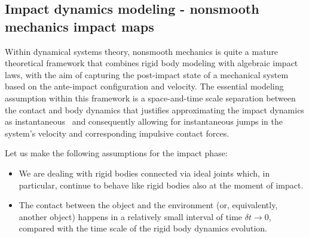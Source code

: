 \documentclass[letterpaper, 10 pt, conference]{ieeeconf}  %
\begin{document}
\subsection{Impact dynamics modeling - nonsmooth mechanics impact maps}
Within dynamical systems theory, nonsmooth mechanics is quite a mature theoretical framework that combines
rigid body modeling with algebraic impact laws, with the aim
of capturing the post-impact state of a mechanical system
based on the ante-impact configuration and velocity. The
essential modeling assumption within this framework is a
space-and-time scale separation between the contact and body
dynamics that justifies approximating the impact dynamics
as instantaneous~\cite{impact_dyn::aouaj2021postimpact} and consequently
allowing for instantaneous jumps in the system’s velocity and
corresponding impulsive contact forces.

Let us make the following assumptions for the impact phase:
\begin{itemize}
\item We are dealing with rigid bodies connected via ideal joints which, in particular, continue to behave like rigid bodies also at the moment of impact.
\item The contact between the object and the environment (or, equivalently, another object) happens in a relatively small interval of time $\delta t \rightarrow0$, compared with the time scale of the rigid body dynamics evolution. 
\end{itemize}
\end{document}
